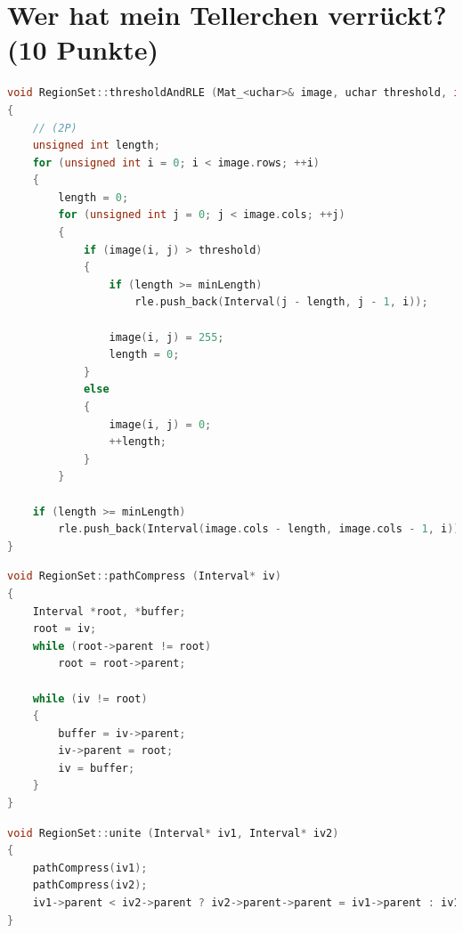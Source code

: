 \documentclass{ezb}
\begin{document}

\section{Wer hat mein Tellerchen verrückt? (10 Punkte)}

\begin{lstlisting}[language=C++, caption=Binarizes and run length codes image]
void RegionSet::thresholdAndRLE (Mat_<uchar>& image, uchar threshold, int minLength)
{
	// (2P)
	unsigned int length;
	for (unsigned int i = 0; i < image.rows; ++i)
	{
		length = 0;
		for (unsigned int j = 0; j < image.cols; ++j)
		{
			if (image(i, j) > threshold)
			{
				if (length >= minLength)
					rle.push_back(Interval(j - length, j - 1, i));
			
				image(i, j) = 255;
				length = 0;
			}
			else
			{
				image(i, j) = 0;
				++length;
			}
		}
		
	if (length >= minLength)
		rle.push_back(Interval(image.cols - length, image.cols - 1, i));
}
\end{lstlisting}

\begin{lstlisting}[language=C++, caption=Auxiliary routine for unite]
void RegionSet::pathCompress (Interval* iv)
{
	Interval *root, *buffer;
	root = iv;
	while (root->parent != root)
		root = root->parent;
		
	while (iv != root)
	{
		buffer = iv->parent;
		iv->parent = root;
		iv = buffer;
	}
}
\end{lstlisting}

\begin{lstlisting}[language=C++, caption=Auxiliary routine for group regions]
void RegionSet::unite (Interval* iv1, Interval* iv2)
{
	pathCompress(iv1);
	pathCompress(iv2);
	iv1->parent < iv2->parent ? iv2->parent->parent = iv1->parent : iv1->parent->parent = iv2->parent;
}
\end{lstlisting}
\end{document}

